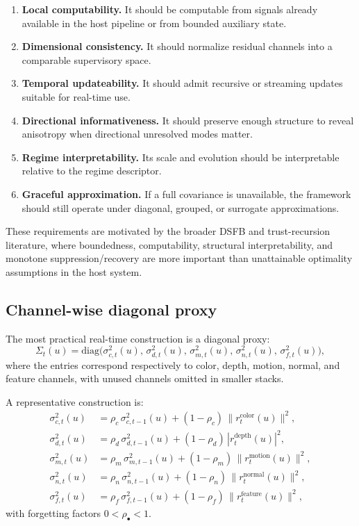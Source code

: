 \documentclass[11pt,letterpaper]{article}
\theoremstyle{gcresult}
\theoremstyle{definition}
\begin{document}
\begin{enumerate}[leftmargin=1.5em]
    \item \textbf{Local computability.} It should be computable from signals already available in the host pipeline or from bounded auxiliary state.
    \item \textbf{Dimensional consistency.} It should normalize residual channels into a comparable supervisory space.
    \item \textbf{Temporal updateability.} It should admit recursive or streaming updates suitable for real-time use.
    \item \textbf{Directional informativeness.} It should preserve enough structure to reveal anisotropy when directional unresolved modes matter.
    \item \textbf{Regime interpretability.} Its scale and evolution should be interpretable relative to the regime descriptor.
    \item \textbf{Graceful approximation.} If a full covariance is unavailable, the framework should still operate under diagonal, grouped, or surrogate approximations.
\end{enumerate}

These requirements are motivated by the broader DSFB and trust-recursion literature, where boundedness, computability, structural interpretability, and monotone suppression/recovery are more important than unattainable optimality assumptions in the host system.


\subsection{Channel-wise diagonal proxy}

The most practical real-time construction is a diagonal proxy:
\begin{equation}
\Sigma_t(u)=
\mathrm{diag}\!\bigl(
\sigma^{2}_{c,t}(u),\,
\sigma^{2}_{d,t}(u),\,
\sigma^{2}_{m,t}(u),\,
\sigma^{2}_{n,t}(u),\,
\sigma^{2}_{f,t}(u)
\bigr),
\end{equation}
where the entries correspond respectively to color, depth, motion, normal, and feature channels, with unused channels omitted in smaller stacks.

A representative construction is:
\begin{align}
\sigma^{2}_{c,t}(u) &= \rho_c\,\sigma^{2}_{c,t-1}(u) + (1-\rho_c)\,\|r^{\mathrm{color}}_t(u)\|^2,\\
\sigma^{2}_{d,t}(u) &= \rho_d\,\sigma^{2}_{d,t-1}(u) + (1-\rho_d)\,|r^{\mathrm{depth}}_t(u)|^2,\\
\sigma^{2}_{m,t}(u) &= \rho_m\,\sigma^{2}_{m,t-1}(u) + (1-\rho_m)\,\|r^{\mathrm{motion}}_t(u)\|^2,\\
\sigma^{2}_{n,t}(u) &= \rho_n\,\sigma^{2}_{n,t-1}(u) + (1-\rho_n)\,\|r^{\mathrm{normal}}_t(u)\|^2,\\
\sigma^{2}_{f,t}(u) &= \rho_f\,\sigma^{2}_{f,t-1}(u) + (1-\rho_f)\,\|r^{\mathrm{feature}}_t(u)\|^2,
\end{align}
with forgetting factors $0<\rho_\bullet<1$.
\end{document}
